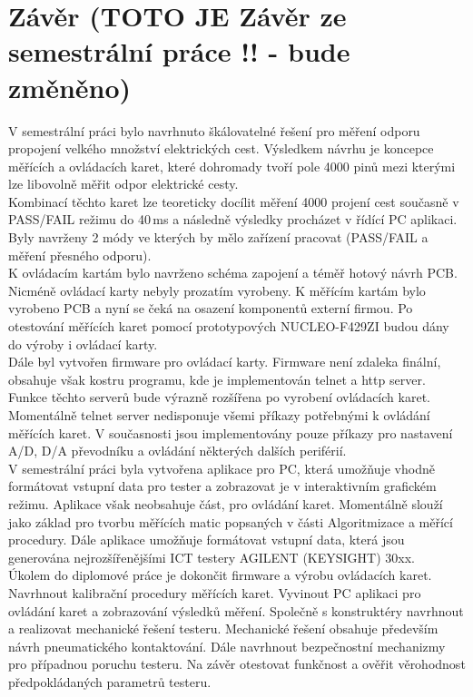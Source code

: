 \chapter*{Závěr (TOTO JE Závěr ze semestrální práce !! - bude změněno)}
{}

V semestrální práci bylo navrhnuto škálovatelné řešení pro měření
odporu propojení velkého množství elektrických cest. Výsledkem návrhu
je koncepce měřících a ovládacích karet, které dohromady tvoří pole 4000 pinů
mezi kterými lze libovolně měřit odpor elektrické cesty.\\

Kombinací těchto karet lze teoreticky docílit měření 4000 projení cest současně v PASS/FAIL režimu do 40\,ms
a následně výsledky procházet v řídící PC aplikaci.
Byly navrženy 2 módy ve kterých by mělo zařízení pracovat (PASS/FAIL a měření přesného odporu).\\

K ovládacím kartám bylo navrženo schéma zapojení a téměř hotový návrh PCB. Nicméně ovládací karty nebyly prozatím vyrobeny.
K měřícím kartám bylo vyrobeno PCB a nyní se čeká na osazení komponentů externí firmou.
Po otestování měřících karet pomocí prototypových NUCLEO-F429ZI budou dány do výroby i ovládací karty.\\

Dále byl vytvořen firmware pro ovládací karty. Firmware není zdaleka finální, obsahuje však kostru programu, kde
je implementován telnet a http server. Funkce těchto serverů bude výrazně rozšířena po vyrobení ovládacích karet.
Momentálně telnet server nedisponuje všemi příkazy potřebnými k ovládání měřících karet. V současnosti jsou implementovány
pouze příkazy pro nastavení A/D, D/A převodníku a ovládání některých dalších periférií.\\

V semestrální práci byla vytvořena aplikace pro PC, která umožňuje vhodně formátovat vstupní data pro tester a zobrazovat je 
v interaktivním grafickém režimu. 
Aplikace však neobsahuje část, pro ovládání karet. Momentálně slouží jako základ
pro tvorbu měřících matic popsaných v části Algoritmizace a měřící procedury. Dále aplikace
umožňuje formátovat vstupní data, která jsou generována nejrozšířenějšími ICT testery AGILENT (KEYSIGHT) 30xx.\\

Úkolem do diplomové práce je dokončit firmware a výrobu ovládacích karet. Navrhnout kalibrační procedury měřících karet.
Vyvinout PC aplikaci pro ovládání karet a zobrazování výsledků měření.
Společně s konstruktéry navrhnout a realizovat mechanické řešení testeru.
Mechanické řešení obsahuje především návrh pneumatického kontaktování.
Dále navrhnout bezpečnostní mechanizmy pro případnou poruchu testeru.
Na závěr otestovat funkčnost a ověřit věrohodnost předpokládaných parametrů testeru. 
